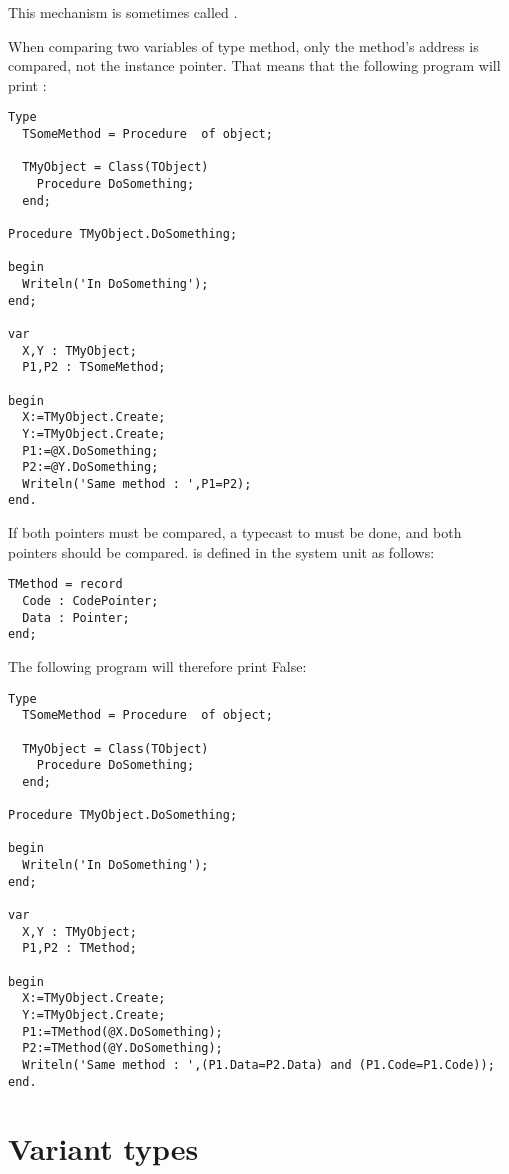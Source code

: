 This mechanism is sometimes called .

\begin{remark}
When comparing two variables of type method, only the method's address is compared,
not the instance pointer. That means that the following program will print :
\begin{verbatim}
Type 
  TSomeMethod = Procedure  of object;

  TMyObject = Class(TObject)
    Procedure DoSomething;
  end;

Procedure TMyObject.DoSomething;

begin
  Writeln('In DoSomething');
end;

var
  X,Y : TMyObject;
  P1,P2 : TSomeMethod;

begin
  X:=TMyObject.Create;
  Y:=TMyObject.Create;
  P1:=@X.DoSomething;
  P2:=@Y.DoSomething;
  Writeln('Same method : ',P1=P2);
end.
\end{verbatim}
If both pointers must be compared, a typecast to  must be done, and
both pointers should be compared.  is defined in the system
unit as follows:
\begin{verbatim}
TMethod = record
  Code : CodePointer;
  Data : Pointer;
end;
\end{verbatim}
The following program will therefore print False:
\begin{verbatim}
Type 
  TSomeMethod = Procedure  of object;

  TMyObject = Class(TObject)
    Procedure DoSomething;
  end;

Procedure TMyObject.DoSomething;

begin
  Writeln('In DoSomething');
end;

var
  X,Y : TMyObject;
  P1,P2 : TMethod;

begin
  X:=TMyObject.Create;
  Y:=TMyObject.Create;
  P1:=TMethod(@X.DoSomething);
  P2:=TMethod(@Y.DoSomething);
  Writeln('Same method : ',(P1.Data=P2.Data) and (P1.Code=P1.Code));
end.
\end{verbatim}
\end{remark}

\section{Variant types}
 

